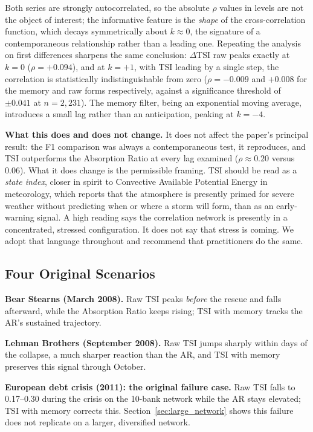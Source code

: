 \documentclass[11pt,a4paper]{article}
\begin{document}
Both series are strongly autocorrelated, so the absolute $\rho$ values in
levels are not the object of interest; the informative feature is the
\emph{shape} of the cross-correlation function, which decays symmetrically
about $k \approx 0$, the signature of a contemporaneous relationship rather
than a leading one. Repeating the analysis on first differences sharpens the
same conclusion: $\Delta\mathrm{TSI}$ raw peaks exactly at $k = 0$ ($\rho = +0.094$),
and at $k = +1$, with TSI leading by a single step, the correlation is
statistically indistinguishable from zero ($\rho = -0.009$ and $+0.008$ for the
memory and raw forms respectively, against a significance threshold of
$\pm 0.041$ at $n = 2{,}231$). The memory filter, being an exponential moving
average, introduces a small lag rather than an anticipation, peaking at
$k = -4$.

\textbf{What this does and does not change.} It does not affect the paper's
principal result: the F1 comparison was always a contemporaneous test, it
reproduces, and TSI outperforms the Absorption Ratio at every lag examined
($\rho \approx 0.20$ versus $0.06$). What it does change is the permissible
framing. TSI should be read as a \emph{state index}, closer in spirit
to Convective Available Potential Energy in meteorology, which reports that the
atmosphere is presently primed for severe weather without predicting when or
where a storm will form, than as an early-warning signal. A high reading
says the correlation network is presently in a concentrated, stressed
configuration. It does not say that stress is coming. We adopt that language
throughout and recommend that practitioners do the same.


\subsection{Four Original Scenarios}

\textbf{Bear Stearns (March 2008).} Raw TSI peaks \emph{before} the
rescue and falls afterward, while the Absorption Ratio keeps rising; TSI
with memory tracks the AR's sustained trajectory.

\textbf{Lehman Brothers (September 2008).} Raw TSI jumps sharply
within days of the collapse, a much sharper reaction than the AR,
and TSI with memory preserves this signal through October.

\textbf{European debt crisis (2011): the original failure case.}
Raw TSI falls to 0.17--0.30 during the crisis on the 10-bank network
while the AR stays elevated; TSI with memory corrects this.
Section~\ref{sec:large_network} shows this failure does not replicate on a
larger, diversified network.
\end{document}
